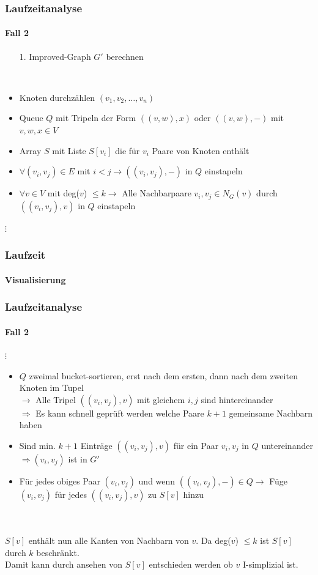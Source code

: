 
\begin{frame}
\frametitle{Laufzeitanalyse}
\framesubtitle{Fall 2}

\begin{enumerate}
	\item[1.] Improved-Graph $G'$ berechnen
\end{enumerate}
\ \\
\begin{itemize} %
	\item Knoten durchzählen $(v_1, v_2, \dots, v_n)$
	\item Queue $Q$ mit Tripeln der Form $((v,w),x)$ oder $((v,w),-)$ mit $v,w,x \in V$
	\item Array $S$ mit Liste $S[v_i]$ die für $v_i$ Paare von Knoten enthält
	\item $\forall (v_i, v_j) \in E$ mit $i < j \rightarrow ((v_i, v_j), -)$ in $Q$ einstapeln
	\item $\forall v \in V$ mit deg($v$) $\leq k \rightarrow$ Alle Nachbarpaare $v_i, v_j \in N_G(v)$ durch $((v_i, v_j),v)$ in $Q$ einstapeln
\end{itemize}
$\vdots$

\end{frame}


\begin{frame}
\frametitle{Laufzeit}
\framesubtitle{Visualisierung}


\end{frame}


\begin{frame}
\frametitle{Laufzeitanalyse}
\framesubtitle{Fall 2}

$\vdots$
\begin{itemize}
	\item $Q$ zweimal bucket-sortieren, erst nach dem ersten, dann nach dem zweiten Knoten im Tupel \\
	$\rightarrow$ Alle Tripel $((v_i, v_j),v)$ mit gleichem $i,j$ sind hintereinander \\
	$\Rightarrow$ Es kann schnell geprüft werden welche Paare $k+1$ gemeinsame Nachbarn haben
	\item Sind min. $k+1$ Einträge $((v_i, v_j), v)$ für ein Paar $v_i, v_j$ in $Q$ untereinander $\Rightarrow (v_i, v_j)$ ist in $G'$
	\item Für jedes obiges Paar $(v_i, v_j)$ und wenn $((v_i, v_j), -) \in Q \rightarrow$ Füge $(v_i, v_j)$ für jedes $((v_i, v_j), v)$ zu $S[v]$ hinzu
\end{itemize}
\ \\
\ \\

$S[v]$ enthält nun alle Kanten von Nachbarn von $v$. Da deg($v$) $\leq k$ ist $S[v]$ durch $k$ beschränkt. \\
Damit kann durch ansehen von $S[v]$ entschieden werden ob $v$ I-simplizial ist.
\end{frame}


